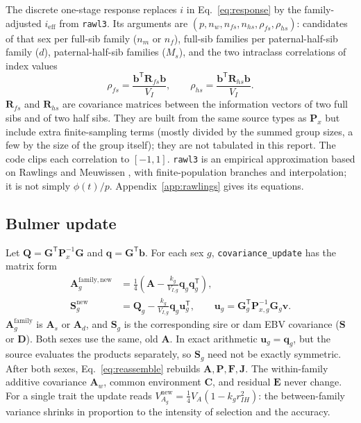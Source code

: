 \documentclass[11pt]{article}
\newcommand{\src}[1]{\texttt{#1}}
\newcommand{\ve}[1]{\boldsymbol{#1}}
\newcommand{\ma}[1]{\mathbf{#1}}
\begin{document}
The discrete one-stage response replaces $i$ in Eq.~\eqref{eq:response} by the family-adjusted $i_{\mathrm{eff}}$ from \src{rawl3}. Its arguments are $(p,n_w,n_{fs},n_{hs},\rho_{fs},\rho_{hs})$: candidates of that sex per full-sib family ($n_m$ or $n_f$), full-sib families per paternal-half-sib family ($d$), paternal-half-sib families ($M_s$), and the two intraclass correlations of index values
\begin{equation}\label{eq:familycorr}
\rho_{fs}=\frac{\ve b^{\mathsf T}\ma R_{fs}\ve b}{V_I},\qquad
\rho_{hs}=\frac{\ve b^{\mathsf T}\ma R_{hs}\ve b}{V_I}.
\end{equation}
$\ma R_{fs}$ and $\ma R_{hs}$ are covariance matrices between the information vectors of two full sibs and of two half sibs. They are built from the same source types as $\ma P_x$ but include extra finite-sampling terms (mostly divided by the summed group sizes, a few by the size of the group itself); they are not tabulated in this report. The code clips each correlation to $[-1,1]$. \src{rawl3} is an empirical approximation based on Rawlings \cite{rawlings1976} and Meuwissen \cite{meuwissen1991}, with finite-population branches and interpolation; it is not simply $\phi(t)/p$. Appendix~\ref{app:rawlings} gives its equations.

\subsection{Bulmer update}\label{sec:bulmer}
Let $\ma Q=\ma G^{\mathsf T}\ma P_x^{-1}\ma G$ and $\ve q=\ma G^{\mathsf T}\ve b$. For each sex $g$, \src{covariance\_update} has the matrix form
\begin{align}\label{eq:bulmer}
\ma A_g^{\mathrm{family,new}}&=\tfrac14\left(\ma A-
\frac{k_g}{V_{I,g}}\ve q_g\ve q_g^{\mathsf T}\right),\\
\ma S_g^{\mathrm{new}}&=\ma Q_g-
\frac{k_g}{V_{I,g}}\ve q_g\ve u_g^{\mathsf T},\qquad
\ve u_g=\ma G_g^{\mathsf T}\ma P_{x,g}^{-1}\ma G_g\ve v.\nonumber
\end{align}
$\ma A_g^{\mathrm{family}}$ is $\ma A_s$ or $\ma A_d$, and $\ma S_g$ is the corresponding sire or dam EBV covariance ($\ma S$ or $\ma D$). Both sexes use the same, old $\ma A$. In exact arithmetic $\ve u_g=\ve q_g$, but the source evaluates the products separately, so $\ma S_g$ need not be exactly symmetric. After both sexes, Eq.~\eqref{eq:reassemble} rebuilds $\ma A,\ma P,\ma F,\ma J$. The within-family additive covariance $\ma A_w$, common environment $\ma C$, and residual $\ma E$ never change. For a single trait the update reads $V_{A_g}^{\mathrm{new}}=\tfrac14V_A(1-k_gr_{IH}^2)$: the between-family variance shrinks in proportion to the intensity of selection and the accuracy.
\end{document}
